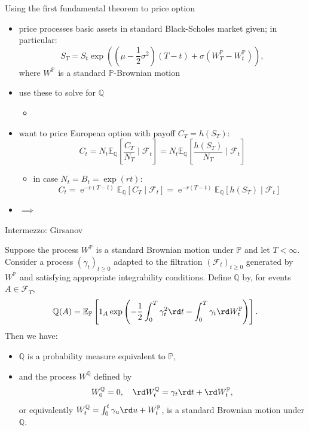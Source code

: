 \documentclass[pdf, handout]{beamer}
\newcommand{\e}{\operatorname{e}}
\begin{document}
\begin{frame}{Using the first fundamental theorem to price option}
\begin{itemize}
\item price processes basic assets in standard Black-Scholes market given; in particular: 
\[
S_T = S_t \exp\left(  (\mu - \frac{1}{2}\sigma^2)(T-t) + \sigma (W_T^{\mathbb{P}} - W_t^{\mathbb{P}})   \right),
\]
where $W^{\mathbb{P}}$ is a standard $\mathbb{P}$-Brownian motion
\item use these to solve for $\mathbb{Q}$
\begin{itemize}
\item \textbf{\color{red}{how?}  }
\end{itemize}
\item want to price European option with payoff $C_T=h(S_T)$:
\[
C_t=N_t \mathbb{E}_{\mathbb{Q}}\left[ \frac{C_T}{N_T} \mid \mathcal{F}_t  \right]
=N_t \mathbb{E}_{\mathbb{Q}}\left[ \frac{h(S_T)}{N_T} \mid \mathcal{F}_t  \right]
\]
\begin{itemize}
\item in case $N_t=B_t=\exp(rt)$:
\[
C_t=\e^{-r(T-t)} \mathbb{E}_{\mathbb{Q}}\left[  C_T \mid \mathcal{F}_t  \right]
=\e^{-r(T-t)} \mathbb{E}_{\mathbb{Q}}\left[  h(S_T) \mid \mathcal{F}_t  \right]
\]
\end{itemize}
\item $\implies$
\textbf{}
\end{itemize}

\end{frame}
%
\begin{frame}{Intermezzo: Girsanov}
\begin{theorem}[Girsanov]
\small{
Suppose the process $W^{\mathbb{P}}$ is a standard Brownian motion under $\mathbb{P}$ and  let $T<\infty$.
Consider a process $(\gamma_t)_{t\geq 0}$  adapted to the filtration $(\mathcal{F}_t)_{t\geq 0}$  generated by $W^{\mathbb{P}}$ and
satisfying appropriate integrability conditions.
Define
$\mathbb{Q}$ by, for events $A \in\mathcal{F}_T$,
\[
\mathbb{Q}(A)=%
\mathbb{E}_{\mathbb{P}}\left[ 1_A \exp\left(  -\frac{1}{2} \int_0^T \gamma_t^2 \rd t   - \int_0^T \gamma_t  \rd W^{\mathbb{P}}_t         \right)\right].
\]
Then we have:
\begin{itemize}
\item
$\mathbb{Q}$ is a probability measure equivalent to $\mathbb{P}$,
\item and the process $W^{\mathbb{Q}}$ defined by
\[
W^{\mathbb{Q}}_0=0,\quad
\rd W^{\mathbb{Q}}_t=\gamma_t \rd t + \rd W^{\mathbb{P}}_t 
,
\]
or equivalently $
W^{\mathbb{Q}}_t=\int_0^t \gamma_u \rd u +  W^{\mathbb{P}}_t$,
is a standard Brownian motion under $\mathbb{Q}$.
\end{itemize}
}
\end{theorem}
\end{frame}
\end{document}
